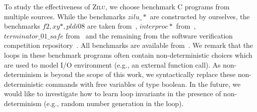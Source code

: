To study the effectiveness of \textsc{Zilu}, we choose benchmark C programs from multiple sources.
While the benchmarks
 $zilu\_*$ are constructed by ourselves,
the benchmarks $f2, xy*, pldi08$ are taken from~\cite{gulwani2008program,sharma2012interpolants,gulavani2008automatically}, %
$interproc*$ from~\cite{jeannet2010interproc},
 $terminator\_01\_safe$ %
 from~\cite{beyer:SVCOMP:2013} and the remaining
from the software verification competition repository~\cite{Dirk:SVCOMP:2016}.  All benchmarks are available from~\cite{zilu:benchmark}.
We remark that the loops in these benchmark programs often contain non-deterministic choices
which are used to model I/O environment (e.g., an external function call).
As non-determinism is beyond the scope of this work, we syntactically replace these non-deterministic commands with free variables of type boolean. In the future, we would like to investigate how to learn loop invariants in the presence of non-determinism (e.g., random number generation in the loop).

